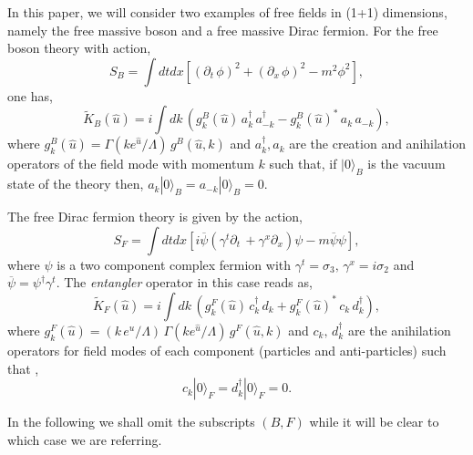 \documentclass[preprint,aps]{revtex4}
\def\beq{\begin{equation}}
\def\eeq{\end{equation}}
\begin{document}
In this paper, we will consider two examples of free fields in (1+1) dimensions, namely the free massive boson and a free massive Dirac fermion. For the free boson theory with action,
\beq
\label{eq1.5}
S_B=\int dt dx \left[\left(\partial_t\, \phi \right)^2 + \left(\partial_x\, \phi \right)^2 -m^2 \phi^2 \right], 
\eeq 
one has,
\beq
\label{eq1.6}
 \widetilde{K}_B(\hat{u}) = i\int dk\, \left( g_k^B(\hat{u})\, a^{\dagger}_k\, a^{\dagger}_{-k} - g_k^{B}(\hat{u})^{*}\, a_k\, a_{-k}\right),
\eeq
where $g_k^B(\hat{u})= \Gamma(k e^{\hat{u}}/\Lambda)\, g^B(\hat{u},k)$ and $a^{\dagger}_k, a_k$ are the creation and anihilation operators of the field mode with momentum $k$ such that, if $|0\rangle_B$ is the vacuum state of the theory then, $a_k |0\rangle_B = a_{-k} |0\rangle_B=0$. 

The free Dirac fermion theory is given by the action,
\beq
\label{eq1.7}
S_F=\int dt dx \left[i\overline{\psi}\left(\gamma^t\partial_t\, + \gamma^x\partial_x \right)\psi  -m \overline{\psi}\psi \right], 
\eeq 
where $\psi$ is a two component complex fermion with $\gamma^t=\sigma_3,\, \gamma^x=i\sigma_2$ and $\overline{\psi}=\psi^{\dagger}\gamma^t$. The \textit{entangler} operator in this case reads as,
\beq
\label{eq1.8}
 \widetilde{K}_F(\hat{u}) = i\int dk\, \left( g_k^F(\hat{u})\, c^{\dagger}_k\, d_{k} +g_k^{F}(\hat{u})^{*}\, c_k\, d^{\dagger}_{k}\right),
\eeq
where  $g_k^F(\hat{u})=(k\, e^{u}/\Lambda)\, \Gamma(k e^{\hat{u}}/\Lambda)\, g^F(\hat{u},k)$ and $c_k,\, d^{\dagger}_{k}$ are the anihilation operators for field modes of each component (particles and anti-particles) such that \cite{taka1},
\beq
\label{eq1.9}
c_k |0\rangle_F = d^{\dagger}_k |0\rangle_F=0.
\eeq

In the following we shall omit the subscripts $(B,F)$ while it will be clear to which case we are referring.
\end{document}
